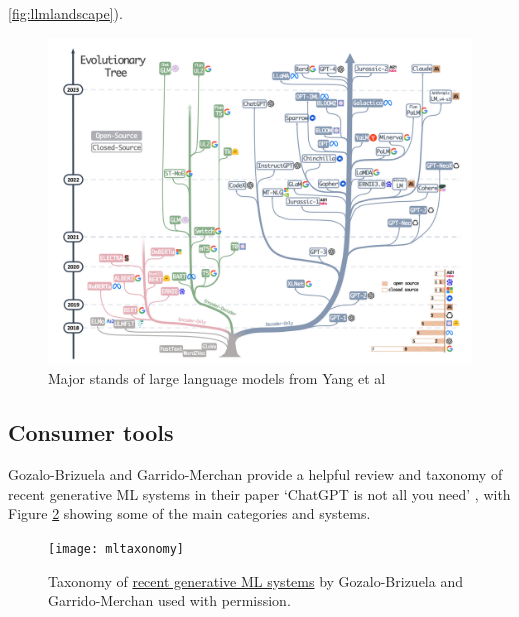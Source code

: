 \ref{fig:llmlandscape}).
\begin{figure}[ht]\centering 	\includegraphics[width=\linewidth]{images/llmlandscape}
	\caption{Major stands of large language models from Yang et al \cite{yang2023harnessing}}
	\label{fig:sequoiacapLandscape}
\end{figure}



\subsection{Consumer tools}
Gozalo-Brizuela and Garrido-Merchan provide a helpful review and taxonomy of recent generative ML systems in their paper `ChatGPT is not all you need' \cite{gozalo2023chatgpt}, with Figure \ref{fig:MLtaxonomy} showing some of the main categories and systems. 

\begin{figure}
  \centering
    \texttt{[image: mltaxonomy]}
  \caption{Taxonomy of \href{https://arxiv.org/abs/2301.04655}{recent generative ML systems} by Gozalo-Brizuela and Garrido-Merchan used with permission.}
  \label{fig:MLtaxonomy}
\end{figure}
